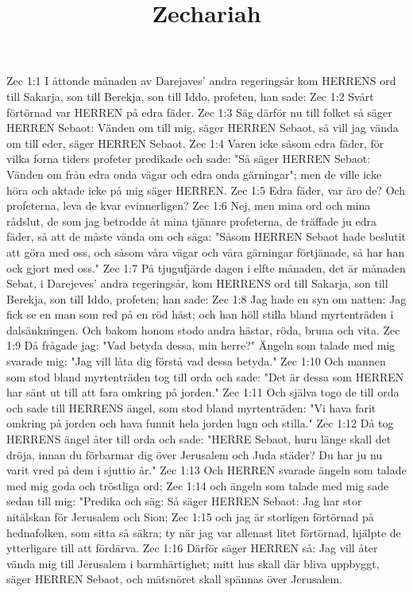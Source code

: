 

\title{Zechariah}

Zec 1:1  I åttonde månaden av Darejaves' andra regeringsår kom HERRENS ord till Sakarja, son till Berekja, son till Iddo, profeten, han sade:
Zec 1:2  Svårt förtörnad var HERREN på edra fäder.
Zec 1:3  Säg därför nu till folket så säger HERREN Sebaot: Vänden om till mig, säger HERREN Sebaot, så vill jag vända om till eder, säger HERREN Sebaot.
Zec 1:4  Varen icke såsom edra fäder, för vilka forna tiders profeter predikade och sade: "Så säger HERREN Sebaot: Vänden om från edra onda vägar och edra onda gärningar"; men de ville icke höra och aktade icke på mig säger HERREN.
Zec 1:5  Edra fäder, var äro de? Och profeterna, leva de kvar evinnerligen?
Zec 1:6  Nej, men mina ord och mina rådslut, de som jag betrodde åt mina tjänare profeterna, de träffade ju edra fäder, så att de måste vända om och säga: "Såsom HERREN Sebaot hade beslutit att göra med oss, och såsom våra vägar och våra gärningar förtjänade, så har han ock gjort med oss."
Zec 1:7  På tjugufjärde dagen i elfte månaden, det är månaden Sebat, i Darejeves' andra regeringsår, kom HERRENS ord till Sakarja, son till Berekja, son till Iddo, profeten; han sade:
Zec 1:8  Jag hade en syn om natten: Jag fick se en man som red på en röd häst; och han höll stilla bland myrtenträden i dalsänkningen. Och bakom honom stodo andra hästar, röda, bruna och vita.
Zec 1:9  Då frågade jag: "Vad betyda dessa, min herre?" Ängeln som talade med mig svarade mig: "Jag vill låta dig förstå vad dessa betyda."
Zec 1:10  Och mannen som stod bland myrtenträden tog till orda och sade: "Det är dessa som HERREN har sänt ut till att fara omkring på jorden."
Zec 1:11  Och själva togo de till orda och sade till HERRENS ängel, som stod bland myrtenträden: "Vi hava farit omkring på jorden och hava funnit hela jorden lugn och stilla."
Zec 1:12  Då tog HERRENS ängel åter till orda och sade: "HERRE Sebaot, huru länge skall det dröja, innan du förbarmar dig över Jerusalem och Juda städer? Du har ju nu varit vred på dem i sjuttio år."
Zec 1:13  Och HERREN svarade ängeln som talade med mig goda och tröstliga ord;
Zec 1:14  och ängeln som talade med mig sade sedan till mig: "Predika och säg: Så säger HERREN Sebaot: Jag har stor nitälskan för Jerusalem och Sion;
Zec 1:15  och jag är storligen förtörnad på hednafolken, som sitta så säkra; ty när jag var allenast litet förtörnad, hjälpte de ytterligare till att fördärva.
Zec 1:16  Därför säger HERREN så: Jag vill åter vända mig till Jerusalem i barmhärtighet; mitt hus skall där bliva uppbyggt, säger HERREN Sebaot, och mätsnöret skall spännas över Jerusalem.
